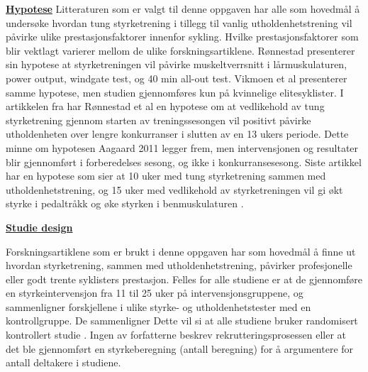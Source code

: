 \documentclass[
]{book}
\begin{document}
\underline{\textbf{Hypotese}} Litteraturen som er valgt til denne oppgaven har alle som hovedmål å undersøke hvordan tung styrketrening i tillegg til vanlig utholdenhetstrening vil påvirke ulike prestasjonsfaktorer innenfor sykling. Hvilke prestasjonsfaktorer som blir vektlagt varierer mellom de ulike forskningsartiklene. Rønnestad \citep{rønnestad2010b} presenterer sin hypotese at styrketreningen vil påvirke muskeltverrsnitt i lårmuskulaturen, power output, windgate test, og 40 min all-out test. Vikmoen et al \citep{vikmoen2016} presenterer samme hypotese, men studien gjennomføres kun på kvinnelige elitesyklister. I artikkelen fra \citep{rønnestad2010a} har Rønnestad et al en hypotese om at vedlikehold av tung styrketrening gjennom starten av treningssesongen vil positivt påvirke utholdenheten over lengre konkurranser i slutten av en 13 ukers periode. Dette minne om hypotesen Aagaard 2011 legger frem, men intervensjonen og resultater blir gjennomført i forberedelses sesong, og ikke i konkurransesesong. Siste artikkel har en hypotese som sier at 10 uker med tung styrketrening sammen med utholdenhetstrening, og 15 uker med vedlikehold av styrketreningen vil gi økt styrke i pedaltråkk og øke styrken i benmuskulaturen \citep{rønnestad2015}.

\underline{\textbf{Studie design}}

Forskningsartiklene som er brukt i denne oppgaven har som hovedmål å finne ut hvordan styrketrening, sammen med utholdenhetstrening, påvirker profesjonelle eller godt trente syklisters prestasjon. Felles for alle studiene er at de gjennomføre en styrkeintervensjon fra 11 til 25 uker på intervensjonsgruppene, og sammenligner forskjellene i ulike styrke- og utholdenhetstester med en kontrollgruppe. De sammenligner Dette vil si at alle studiene bruker randomisert kontrollert studie \citep[RCT{]} som studiedesign. I et RCT blir deltakerne tilfeldig valgt hvilken gruppe de tilhører, kontrollgruppe eller intervensjonsgruppe. Ved å tilfeldig fordele de ulike deltakerne i kontrollgruppe, og intervensjonsgruppe vil man minske sannsynligheten for at det er store forskjeller mellom gruppene \[@hulley2013; @Parab2010\]. Det er med fordel at alle studiene i denne oppgaven bruker dette studie designet for å kunne se effekten for intervensjonsgruppen, mot kontrollgruppen. Dette vil si at resultatene vil vise hvilken effekt intervensjonen har eller ikke har, og ikke være påvirket av store gruppeforskjeller \[@helsebiblioteketuå\] . Utvalg: I de ulike studiene skilte deltaker gruppene seg fra 12 til 23 deltakere. Alle deltakerne var godt trente syklister. I noen av prosjektene var deltakerne syklister på høyt nasjonalt eller internasjonalt nivå {[}][]{rønnestad2010a, rønnestad2010b, rønnestad2015, aagaard2011}. Ingen av forfatterne beskrev rekrutteringsprosessen eller at det ble gjennomført en styrkeberegning (antall beregning) for å argumentere for antall deltakere i studiene.
\end{document}
